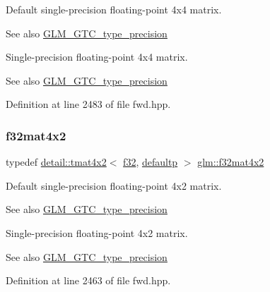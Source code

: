 Default single-\/precision floating-\/point 4x4 matrix. \begin{DoxySeeAlso}{See also}
\hyperlink{group__gtc__type__precision}{G\+L\+M\+\_\+\+G\+T\+C\+\_\+type\+\_\+precision}
\end{DoxySeeAlso}
Single-\/precision floating-\/point 4x4 matrix. \begin{DoxySeeAlso}{See also}
\hyperlink{group__gtc__type__precision}{G\+L\+M\+\_\+\+G\+T\+C\+\_\+type\+\_\+precision} 
\end{DoxySeeAlso}


Definition at line 2483 of file fwd.\+hpp.

\mbox{\label{group__gtc__type__precision_ga6aee56c6561190811699bfd2b1cd0d57}} 
\subsubsection{\texorpdfstring{f32mat4x2}{f32mat4x2}}
{\footnotesize\ttfamily typedef \hyperlink{structglm_1_1detail_1_1tmat4x2}{detail\+::tmat4x2}$<$ \hyperlink{group__gtc__type__precision_ga0ec999b57f5330d9021256e96038df04}{f32}, \hyperlink{namespaceglm_a0f04f086094c747d227af4425893f545a9d21ccd8b5a009ec7eb7677befc3bf51}{defaultp} $>$ \hyperlink{group__gtc__type__precision_ga6aee56c6561190811699bfd2b1cd0d57}{glm\+::f32mat4x2}}

Default single-\/precision floating-\/point 4x2 matrix. \begin{DoxySeeAlso}{See also}
\hyperlink{group__gtc__type__precision}{G\+L\+M\+\_\+\+G\+T\+C\+\_\+type\+\_\+precision}
\end{DoxySeeAlso}
Single-\/precision floating-\/point 4x2 matrix. \begin{DoxySeeAlso}{See also}
\hyperlink{group__gtc__type__precision}{G\+L\+M\+\_\+\+G\+T\+C\+\_\+type\+\_\+precision} 
\end{DoxySeeAlso}


Definition at line 2463 of file fwd.\+hpp.

\mbox{\label{group__gtc__type__precision_ga5102ae88531e072efe57e75354e10347}} 

